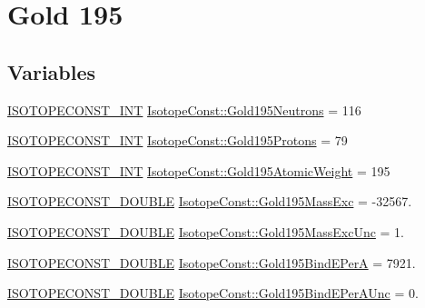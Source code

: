 \hypertarget{group___isotope_const-_gold-_au195}{}\section{Gold 195}
\label{group___isotope_const-_gold-_au195}
\subsection*{Variables}
\begin{DoxyCompactItemize}
\item 
\mbox{\hyperlink{group___isotope_const-_macros_ga5f18360b3e99483a35c32d789e62621c}{I\+S\+O\+T\+O\+P\+E\+C\+O\+N\+S\+T\+\_\+\+I\+NT}} \mbox{\hyperlink{group___isotope_const-_gold-_au195_gad74eb410c745e78e269ea6f41a11f680}{Isotope\+Const\+::\+Gold195\+Neutrons}} = 116
\item 
\mbox{\hyperlink{group___isotope_const-_macros_ga5f18360b3e99483a35c32d789e62621c}{I\+S\+O\+T\+O\+P\+E\+C\+O\+N\+S\+T\+\_\+\+I\+NT}} \mbox{\hyperlink{group___isotope_const-_gold-_au195_gaf28cce408a40b792846557dc3712f38e}{Isotope\+Const\+::\+Gold195\+Protons}} = 79
\item 
\mbox{\hyperlink{group___isotope_const-_macros_ga5f18360b3e99483a35c32d789e62621c}{I\+S\+O\+T\+O\+P\+E\+C\+O\+N\+S\+T\+\_\+\+I\+NT}} \mbox{\hyperlink{group___isotope_const-_gold-_au195_ga563537b208fb76e837053a846b1582bc}{Isotope\+Const\+::\+Gold195\+Atomic\+Weight}} = 195
\item 
\mbox{\hyperlink{group___isotope_const-_macros_ga8f45a7272ce02c0b4c65c44636ed719a}{I\+S\+O\+T\+O\+P\+E\+C\+O\+N\+S\+T\+\_\+\+D\+O\+U\+B\+LE}} \mbox{\hyperlink{group___isotope_const-_gold-_au195_gaf6492e1ca067c1ee30d6478543eb7cde}{Isotope\+Const\+::\+Gold195\+Mass\+Exc}} = -\/32567.
\item 
\mbox{\hyperlink{group___isotope_const-_macros_ga8f45a7272ce02c0b4c65c44636ed719a}{I\+S\+O\+T\+O\+P\+E\+C\+O\+N\+S\+T\+\_\+\+D\+O\+U\+B\+LE}} \mbox{\hyperlink{group___isotope_const-_gold-_au195_ga8dbb9630b5cbdb68ea1724d98d910b51}{Isotope\+Const\+::\+Gold195\+Mass\+Exc\+Unc}} = 1.
\item 
\mbox{\hyperlink{group___isotope_const-_macros_ga8f45a7272ce02c0b4c65c44636ed719a}{I\+S\+O\+T\+O\+P\+E\+C\+O\+N\+S\+T\+\_\+\+D\+O\+U\+B\+LE}} \mbox{\hyperlink{group___isotope_const-_gold-_au195_ga62112757cecc44f9449c624de6bd068a}{Isotope\+Const\+::\+Gold195\+Bind\+E\+PerA}} = 7921.
\item 
\mbox{\hyperlink{group___isotope_const-_macros_ga8f45a7272ce02c0b4c65c44636ed719a}{I\+S\+O\+T\+O\+P\+E\+C\+O\+N\+S\+T\+\_\+\+D\+O\+U\+B\+LE}} \mbox{\hyperlink{group___isotope_const-_gold-_au195_ga5fcd1f6e138f1e9ffedcc43144f108ec}{Isotope\+Const\+::\+Gold195\+Bind\+E\+Per\+A\+Unc}} = 0.

\end{DoxyCompactItemize}

